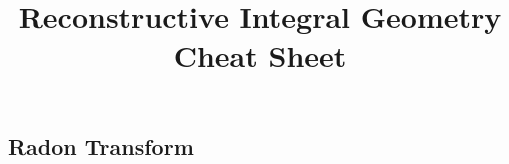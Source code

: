 \documentclass[14pt]{extarticle}
\title{Reconstructive Integral Geometry Cheat Sheet}
\begin{document}
	\maketitle	
	\begin{outline}		
	\section*{Radon Transform}

	\end{outline}
\end{document}
